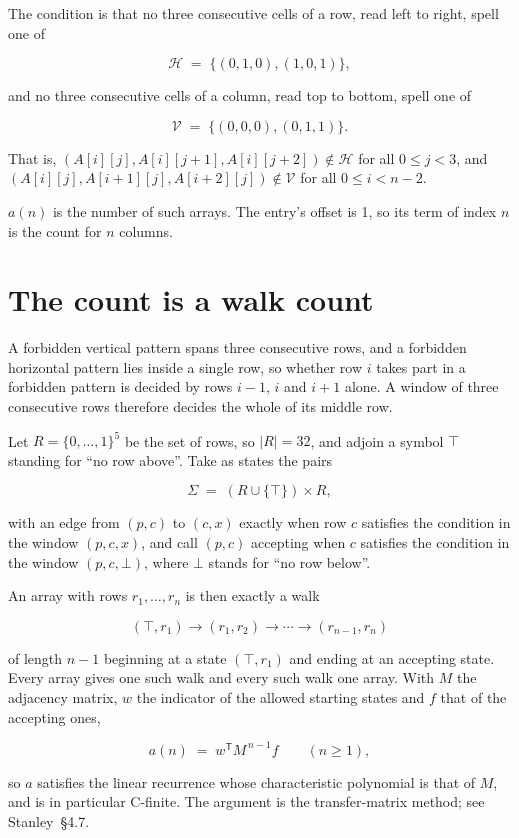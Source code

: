 \documentclass[11pt]{article}
\theoremstyle{definition}
\begin{document}
The condition is that no three consecutive cells of a row, read left to right, spell one of

\[\mathcal{H} \;=\; \{(0,1,0), (1,0,1)\},\]

and no three consecutive cells of a column, read top to bottom, spell one of

\[\mathcal{V} \;=\; \{(0,0,0), (0,1,1)\}.\]

That is, $(A[i][j],A[i][j{+}1],A[i][j{+}2]) \notin \mathcal{H}$ for all $0 \le j < 3$, and $(A[i][j],A[i{+}1][j],A[i{+}2][j]) \notin \mathcal{V}$ for all $0 \le i < n-2$.

$a(n)$ is the number of such arrays. The entry's offset is 1, so its term of index $n$ is the count for $n$ columns.

\section{The count is a walk count}

A forbidden vertical pattern spans three consecutive rows, and a forbidden horizontal pattern lies inside a single row, so whether row $i$ takes part in a forbidden pattern is decided by rows $i-1$, $i$ and $i+1$ alone. A window of three consecutive rows therefore decides the whole of its middle row.

Let $R = \{0,\dots,1\}^{5}$ be the set of rows, so $|R| = 32$, and adjoin a symbol $\top$ standing for ``no row above''. Take as states the pairs

\[\Sigma \;=\; (R \cup \{\top\}) \times R,\]

with an edge from $(p,c)$ to $(c,x)$ exactly when row $c$ satisfies the condition in the window $(p,c,x)$, and call $(p,c)$ accepting when $c$ satisfies the condition in the window $(p,c,\bot)$, where $\bot$ stands for ``no row below''.

An array with rows $r_1,\dots,r_n$ is then exactly a walk

\[(\top,r_1) \to (r_1,r_2) \to \cdots \to (r_{n-1},r_n)\]

of length $n-1$ beginning at a state $(\top,r_1)$ and ending at an accepting state. Every array gives one such walk and every such walk one array. With $M$ the adjacency matrix, $w$ the indicator of the allowed starting states and $f$ that of the accepting ones,

\[a(n) \;=\; w^{\mathsf T} M^{\,n-1} f \qquad (n \ge 1),\]

so $a$ satisfies the linear recurrence whose characteristic polynomial is that of $M$, and is in particular C-finite. The argument is the transfer-matrix method; see Stanley~\S4.7.
\end{document}
